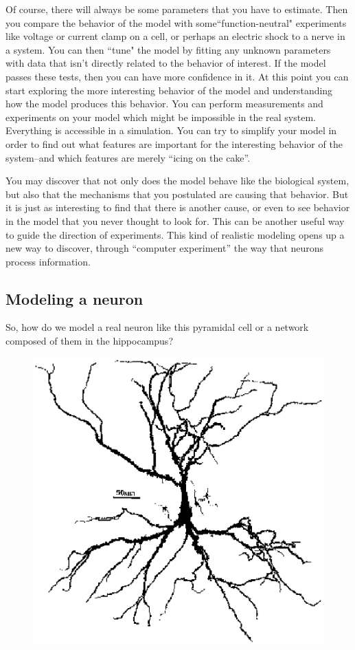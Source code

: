 \documentclass[12pt]{article}
\begin{document}
Of course, there will always be some parameters that you have to estimate. Then you compare the behavior of the model with some``function-neutral" experiments like voltage or current clamp on a cell, or perhaps an electric shock to a nerve in a system. You can then ``tune" the model by fitting any unknown parameters with data that isn't directly related to the behavior of interest. If the model passes these tests, then you can have more confidence in it. At this point you can start exploring the more interesting behavior of the model and understanding how the model produces this behavior. You can perform measurements and experiments on your model which might be impossible in the real system. Everything is accessible in a simulation. You can try to simplify your model in order to find out what features are important for the interesting behavior of the system--and which features are merely ``icing on the cake''.

You may discover that not only does the model behave like the biological system, but also that the mechanisms that you postulated are causing that behavior. But it is just as interesting to find that there is another cause, or even to see behavior in the model that you never thought to look for. This can be another useful way to guide the direction of experiments. This kind of realistic modeling opens up a new way to discover, through ``computer experiment'' the way that neurons process information.

\subsection*{Modeling a neuron}

So, how do we model a real neuron like this pyramidal cell or a network composed of them in the hippocampus?

\begin{figure}[h]
  \centering
 \includegraphics[scale=0.6]{figs/ca3smaller.eps}
  \label{fig:ca3smaller}
\end{figure}
\end{document}
